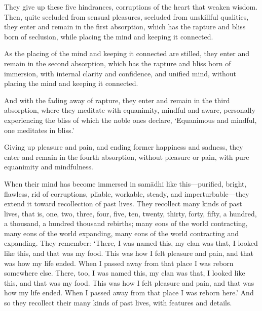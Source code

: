 \documentclass[12pt,openany]{book}%
\begin{document}
They give up these five hindrances, corruptions of the heart that weaken wisdom. Then, quite secluded from sensual pleasures, secluded from unskillful qualities, they enter and remain in the first absorption, which has the rapture and bliss born of seclusion, while placing the mind and keeping it connected. 

As the placing of the mind and keeping it connected are stilled, they enter and remain in the second absorption, which has the rapture and bliss born of immersion, with internal clarity and confidence, and unified mind, without placing the mind and keeping it connected. 

And with the fading away of rapture, they enter and remain in the third absorption, where they meditate with equanimity, mindful and aware, personally experiencing the bliss of which the noble ones declare, ‘Equanimous and mindful, one meditates in bliss.’ 

Giving up pleasure and pain, and ending former happiness and sadness, they enter and remain in the fourth absorption, without pleasure or pain, with pure equanimity and mindfulness. 

When their mind has become immersed in \textsanskrit{samādhi} like this—purified, bright, flawless, rid of corruptions, pliable, workable, steady, and imperturbable—they extend it toward recollection of past lives. They recollect many kinds of past lives, that is, one, two, three, four, five, ten, twenty, thirty, forty, fifty, a hundred, a thousand, a hundred thousand rebirths; many eons of the world contracting, many eons of the world expanding, many eons of the world contracting and expanding. They remember: ‘There, I was named this, my clan was that, I looked like this, and that was my food. This was how I felt pleasure and pain, and that was how my life ended. When I passed away from that place I was reborn somewhere else. There, too, I was named this, my clan was that, I looked like this, and that was my food. This was how I felt pleasure and pain, and that was how my life ended. When I passed away from that place I was reborn here.’ And so they recollect their many kinds of past lives, with features and details. 
\end{document}
